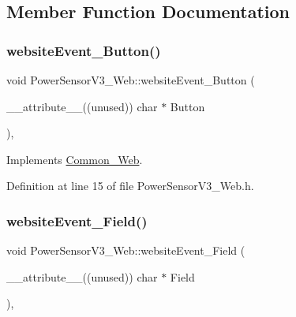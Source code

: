 \subsection{Member Function Documentation}
\mbox{\label{class_power_sensor_v3___web_a6032d4ab98373d58ac532c4aa03c8f26}} 
\subsubsection{\texorpdfstring{website\+Event\+\_\+\+Button()}{websiteEvent\_Button()}}
{\footnotesize\ttfamily void Power\+Sensor\+V3\+\_\+\+Web\+::website\+Event\+\_\+\+Button (\begin{DoxyParamCaption}\item[{\+\_\+\+\_\+attribute\+\_\+\+\_\+((unused)) char $\ast$}]{Button }\end{DoxyParamCaption})\hspace{0.3cm}{\ttfamily [inline]}, {\ttfamily [virtual]}}



Implements \hyperlink{class_common___web_acd10f27b30f3111277b4730ee5495090}{Common\+\_\+\+Web}.



Definition at line 15 of file Power\+Sensor\+V3\+\_\+\+Web.\+h.

\mbox{\label{class_power_sensor_v3___web_a80d9707667d1ac9f6dc1ccf1b6a07287}} 
\subsubsection{\texorpdfstring{website\+Event\+\_\+\+Field()}{websiteEvent\_Field()}}
{\footnotesize\ttfamily void Power\+Sensor\+V3\+\_\+\+Web\+::website\+Event\+\_\+\+Field (\begin{DoxyParamCaption}\item[{\+\_\+\+\_\+attribute\+\_\+\+\_\+((unused)) char $\ast$}]{Field }\end{DoxyParamCaption})\hspace{0.3cm}{\ttfamily [inline]}, {\ttfamily [virtual]}}



